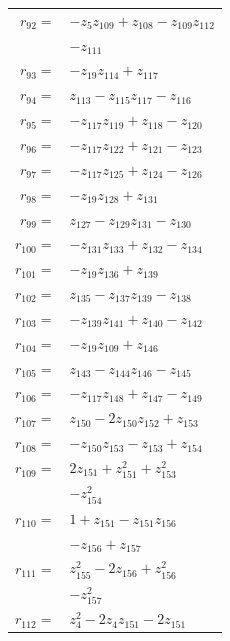 \begin{longtable}{@{}r@{\;}l@{}}
\(r_{92}=\) & \(\displaystyle -z_{5}z_{109} +z_{108} -z_{109}z_{112}\) \\
 & \(\displaystyle -z_{111}\) \\[3pt]
\(r_{93}=\) & \(\displaystyle -z_{19}z_{114} +z_{117}\) \\[3pt]
\(r_{94}=\) & \(\displaystyle z_{113} -z_{115}z_{117} -z_{116}\) \\[3pt]
\(r_{95}=\) & \(\displaystyle -z_{117}z_{119} +z_{118} -z_{120}\) \\[3pt]
\(r_{96}=\) & \(\displaystyle -z_{117}z_{122} +z_{121} -z_{123}\) \\[3pt]
\(r_{97}=\) & \(\displaystyle -z_{117}z_{125} +z_{124} -z_{126}\) \\[3pt]
\(r_{98}=\) & \(\displaystyle -z_{19}z_{128} +z_{131}\) \\[3pt]
\(r_{99}=\) & \(\displaystyle z_{127} -z_{129}z_{131} -z_{130}\) \\[3pt]
\(r_{100}=\) & \(\displaystyle -z_{131}z_{133} +z_{132} -z_{134}\) \\[3pt]
\(r_{101}=\) & \(\displaystyle -z_{19}z_{136} +z_{139}\) \\[3pt]
\(r_{102}=\) & \(\displaystyle z_{135} -z_{137}z_{139} -z_{138}\) \\[3pt]
\(r_{103}=\) & \(\displaystyle -z_{139}z_{141} +z_{140} -z_{142}\) \\[3pt]
\(r_{104}=\) & \(\displaystyle -z_{19}z_{109} +z_{146}\) \\[3pt]
\(r_{105}=\) & \(\displaystyle z_{143} -z_{144}z_{146} -z_{145}\) \\[3pt]
\(r_{106}=\) & \(\displaystyle -z_{117}z_{148} +z_{147} -z_{149}\) \\[3pt]
\(r_{107}=\) & \(\displaystyle z_{150} -2z_{150}z_{152} +z_{153}\) \\[3pt]
\(r_{108}=\) & \(\displaystyle -z_{150}z_{153} -z_{153} +z_{154}\) \\[3pt]
\(r_{109}=\) & \(\displaystyle 2z_{151} +z_{151}^{2} +z_{153}^{2}\) \\
 & \(\displaystyle -z_{154}^{2}\) \\[3pt]
\(r_{110}=\) & \(\displaystyle 1 +z_{151} -z_{151}z_{156}\) \\
 & \(\displaystyle -z_{156} +z_{157}\) \\[3pt]
\(r_{111}=\) & \(\displaystyle z_{155}^{2} -2z_{156} +z_{156}^{2}\) \\
 & \(\displaystyle -z_{157}^{2}\) \\[3pt]
\(r_{112}=\) & \(\displaystyle z_{4}^{2} -2z_{4}z_{151} -2z_{151}\) \\

\end{longtable}
